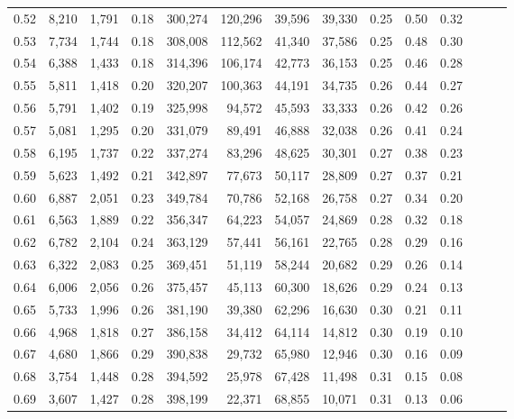 \begin{tabular}{rrrrrrrrrrrrrr}
0.52 &   8,210 &  1,791 &  0.18 &  300,274 &  120,296 &  39,596 &  39,330 &  0.25 &  0.50 &      0.32 \\
0.53 &   7,734 &  1,744 &  0.18 &  308,008 &  112,562 &  41,340 &  37,586 &  0.25 &  0.48 &      0.30 \\
0.54 &   6,388 &  1,433 &  0.18 &  314,396 &  106,174 &  42,773 &  36,153 &  0.25 &  0.46 &      0.28 \\
0.55 &   5,811 &  1,418 &  0.20 &  320,207 &  100,363 &  44,191 &  34,735 &  0.26 &  0.44 &      0.27 \\
0.56 &   5,791 &  1,402 &  0.19 &  325,998 &   94,572 &  45,593 &  33,333 &  0.26 &  0.42 &      0.26 \\
0.57 &   5,081 &  1,295 &  0.20 &  331,079 &   89,491 &  46,888 &  32,038 &  0.26 &  0.41 &      0.24 \\
0.58 &   6,195 &  1,737 &  0.22 &  337,274 &   83,296 &  48,625 &  30,301 &  0.27 &  0.38 &      0.23 \\
0.59 &   5,623 &  1,492 &  0.21 &  342,897 &   77,673 &  50,117 &  28,809 &  0.27 &  0.37 &      0.21 \\
0.60 &   6,887 &  2,051 &  0.23 &  349,784 &   70,786 &  52,168 &  26,758 &  0.27 &  0.34 &      0.20 \\
0.61 &   6,563 &  1,889 &  0.22 &  356,347 &   64,223 &  54,057 &  24,869 &  0.28 &  0.32 &      0.18 \\
0.62 &   6,782 &  2,104 &  0.24 &  363,129 &   57,441 &  56,161 &  22,765 &  0.28 &  0.29 &      0.16 \\
0.63 &   6,322 &  2,083 &  0.25 &  369,451 &   51,119 &  58,244 &  20,682 &  0.29 &  0.26 &      0.14 \\
0.64 &   6,006 &  2,056 &  0.26 &  375,457 &   45,113 &  60,300 &  18,626 &  0.29 &  0.24 &      0.13 \\
0.65 &   5,733 &  1,996 &  0.26 &  381,190 &   39,380 &  62,296 &  16,630 &  0.30 &  0.21 &      0.11 \\
0.66 &   4,968 &  1,818 &  0.27 &  386,158 &   34,412 &  64,114 &  14,812 &  0.30 &  0.19 &      0.10 \\
0.67 &   4,680 &  1,866 &  0.29 &  390,838 &   29,732 &  65,980 &  12,946 &  0.30 &  0.16 &      0.09 \\
0.68 &   3,754 &  1,448 &  0.28 &  394,592 &   25,978 &  67,428 &  11,498 &  0.31 &  0.15 &      0.08 \\
0.69 &   3,607 &  1,427 &  0.28 &  398,199 &   22,371 &  68,855 &  10,071 &  0.31 &  0.13 &      0.06 \\

\end{tabular}
